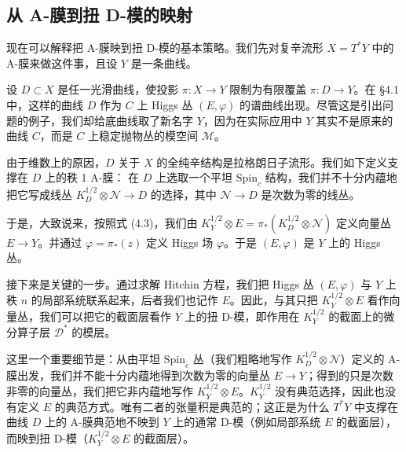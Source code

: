 \subsection{从 A-膜到扭 D-模的映射}

现在可以解释把 A-膜映到扭 D-模的基本策略。我们先对复辛流形 $X=T^*Y$ 中的 A-膜来做这件事，且设 $Y$ 是一条曲线。

设 $D\subset X$ 是任一光滑曲线，使投影 $\pi:X\to Y$ 限制为有限覆盖 $\pi:D\to Y$。在 §4.1 中，这样的曲线 $D$ 作为 $C$ 上 Higgs 丛 $(E,\varphi)$ 的谱曲线出现。尽管这是引出问题的例子，我们却给底曲线取了新名字 $Y$，因为在实际应用中 $Y$ 其实不是原来的曲线 $C$，而是 $C$ 上稳定抛物丛的模空间 $\mathcal{M}$。

由于维数上的原因，$D$ 关于 $X$ 的全纯辛结构是拉格朗日子流形。我们如下定义支撑在 $D$ 上的秩 1 A-膜：
在 $D$ 上选取一个平坦 $\mathrm{Spin}_c$ 结构，我们并不十分内蕴地把它写成线丛 $K_D^{1/2}\otimes\mathcal{N}\to D$ 的选择，其中 $\mathcal{N}\to D$ 是次数为零的线丛。

于是，大致说来，按照式 (4.3)，我们由 $K_Y^{1/2}\otimes E=\pi_*(K_D^{1/2}\otimes\mathcal{N})$ 定义向量丛 $E\to Y$。并通过 $\varphi=\pi_*(z)$ 定义 Higgs 场 $\varphi$。于是 $(E,\varphi)$ 是 $Y$ 上的 Higgs 丛。

接下来是关键的一步。通过求解 Hitchin 方程，我们把 Higgs 丛 $(E,\varphi)$ 与 $Y$ 上秩 $n$ 的局部系统联系起来，后者我们也记作 $E$。因此，与其只把 $K_Y^{1/2}\otimes E$ 看作向量丛，我们可以把它的截面层看作 $Y$ 上的扭 D-模，即作用在 $K_Y^{1/2}$ 的截面上的微分算子层 $\mathcal{D}^*$ 的模层。

这里一个重要细节是：从由平坦 $\mathrm{Spin}_c$ 丛（我们粗略地写作 $K_D^{1/2}\otimes\mathcal{N}$）定义的 A-膜出发，我们并不能十分内蕴地得到次数为零的向量丛 $E\to Y$；得到的只是次数非零的向量丛，我们把它非内蕴地写作 $K_Y^{1/2}\otimes E$。$K_Y^{1/2}$ 没有典范选择，因此也没有定义 $E$ 的典范方式。唯有二者的张量积是典范的；这正是为什么 $T^*Y$ 中支撑在曲线 $D$ 上的 A-膜典范地不映到 $Y$ 上的通常 D-模（例如局部系统 $E$ 的截面层），而映到扭 D-模（$K_Y^{1/2}\otimes E$ 的截面层）。


